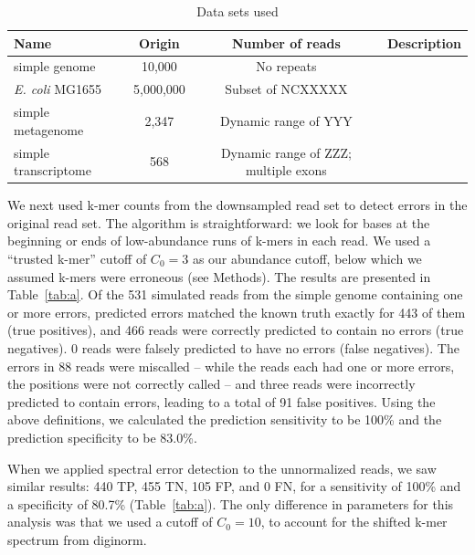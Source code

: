 \documentclass{article}
\begin{document}


\begin{table}
\begin{tabular}{|l|c|c|l|}
\hline
Name & Origin & Number of reads & Description \\
\hline
simple genome & 10,000 & No repeats\\
{\em E. coli} MG1655 & 5,000,000 & Subset of NCXXXXX \\
simple metagenome & 2,347 & Dynamic range of YYY \\
simple transcriptome & 568 & Dynamic range of ZZZ; multiple exons\\
\hline
\end{tabular}

\caption{Data sets used}
\label{tab:data}
\end{table}

We next used k-mer counts from the downsampled read set to detect
errors in the original read set.  The algorithm is straightforward: we
look for bases at the beginning or ends of low-abundance runs of
k-mers in each read. We used a ``trusted k-mer'' cutoff of $C_0 = 3$
as our abundance cutoff, below which we assumed k-mers were erroneous
(see Methods).  The results are presented in Table~\ref{tab:a}.  Of
the 531 simulated reads from the simple genome containing one or more
errors, predicted errors matched the known truth exactly for 443 of
them (true positives), and 466 reads were correctly predicted to
contain no errors (true negatives). 0 reads were falsely predicted to
have no errors (false negatives). The errors in 88 reads were
miscalled -- while the reads each had one or more errors, the
positions were not correctly called -- and three reads were
incorrectly predicted to contain errors, leading to a total of 91
false positives.  Using the above definitions, we calculated the
prediction sensitivity to be 100\% and the prediction specificity to
be 83.0\%.


When we applied spectral error detection to the unnormalized reads, we
saw similar results: 440 TP, 455 TN, 105 FP, and 0 FN, for a
sensitivity of 100\% and a specificity of 80.7\% (Table~\ref{tab:a}). The only difference
in parameters for this analysis was that we used a cutoff of $C_0=10$,
to account for the shifted k-mer spectrum from diginorm.
\end{document}
